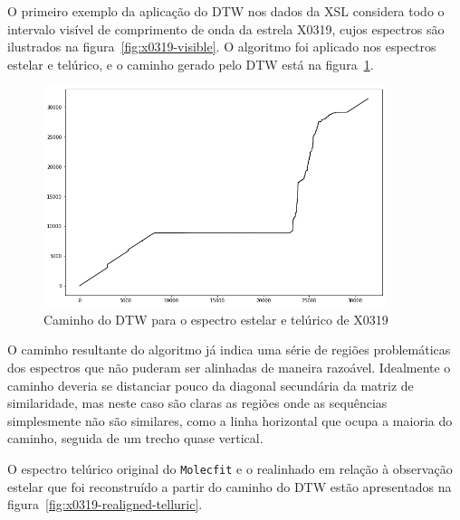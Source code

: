 O primeiro exemplo da aplicação do DTW nos dados da XSL considera todo o intervalo visível de comprimento de onda da estrela X0319, cujos espectros são ilustrados na figura~\ref{fig:x0319-visible}. O algoritmo foi aplicado nos espectros estelar e telúrico, e o caminho gerado pelo DTW está na figura~\ref{fig:x0319-warp-path}.

\begin{figure}[htb]
\centering
\includegraphics[width=10cm]{figuras/x0319_warp_path.png}
\caption{Caminho do DTW para o espectro estelar e telúrico de X0319}
\label{fig:x0319-warp-path}
\end{figure}

O caminho resultante do algoritmo já indica uma série de regiões problemáticas dos espectros que não puderam ser alinhadas de maneira razoável. Idealmente o caminho deveria se distanciar pouco da diagonal secundária da matriz de similaridade, mas neste caso são claras as regiões onde as sequências simplesmente não são similares, como a linha horizontal que ocupa a maioria do caminho, seguida de um trecho quase vertical.

O espectro telúrico original do \texttt{Molecfit} e o realinhado em relação à observação estelar que foi reconstruído a partir do caminho do DTW estão apresentados na figura~\ref{fig:x0319-realigned-telluric}.

